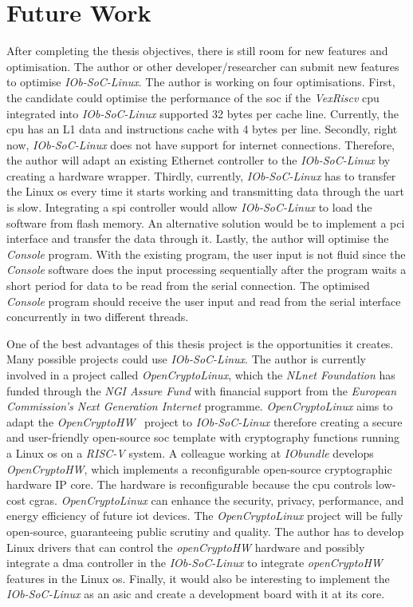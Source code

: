 \section{Future Work}
\label{section:future}
After completing the thesis objectives, there is still room for new features and optimisation. The author or other developer/researcher can submit new features to optimise \textit{IOb-SoC-Linux}. The author is working on four optimisations. First, the candidate could optimise the performance of the \acrshort{soc} if the \textit{VexRiscv} \acrshort{cpu} integrated into \textit{IOb-SoC-Linux} supported 32 bytes per cache line. Currently, the \acrshort{cpu} has an L1 data and instructions cache with 4 bytes per line. Secondly, right now, \textit{IOb-SoC-Linux} does not have support for internet connections. Therefore, the author will adapt an existing Ethernet controller to the \textit{IOb-SoC-Linux} by creating a hardware wrapper. Thirdly, currently, \textit{IOb-SoC-Linux} has to transfer the Linux \acrshort{os} every time it starts working and transmitting data through the \acrshort{uart} is slow. Integrating a \acrfull{spi} controller would allow \textit{IOb-SoC-Linux} to load the software from flash memory. An alternative solution would be to implement a \acrshort{pci} interface and transfer the data through it. Lastly, the author will optimise the \textit{Console} program. With the existing program, the user input is not fluid since the \textit{Console} software does the input processing sequentially after the program waits a short period for data to be read from the serial connection. The optimised \textit{Console} program should receive the user input and read from the serial interface concurrently in two different threads.

One of the best advantages of this thesis project is the opportunities it creates. Many possible projects could use \textit{IOb-SoC-Linux}. The author is currently involved in a project called \textit{OpenCryptoLinux}, which the \textit{NLnet Foundation} has funded through the \textit{NGI Assure Fund} with financial support from the \textit{European Commission's Next Generation Internet} programme. \textit{OpenCryptoLinux} aims to adapt the \textit{OpenCryptoHW}~\cite{open_crypto_hw} project to \textit{IOb-SoC-Linux} therefore creating a secure and user-friendly open-source \acrshort{soc} template with cryptography functions running a Linux \acrshort{os} on a \textit{RISC-V} system. A colleague working at \textit{IObundle} develops \textit{OpenCryptoHW}, which implements a reconfigurable open-source cryptographic hardware IP core. The hardware is reconfigurable because the \acrshort{cpu} controls low-cost \acrfull{cgras}. \textit{OpenCryptoLinux} can enhance the security, privacy, performance, and energy efficiency of future \acrfull{iot} devices. The \textit{OpenCryptoLinux} project will be fully open-source, guaranteeing public scrutiny and quality. The author has to develop Linux drivers that can control the \textit{openCryptoHW} hardware and possibly integrate a \acrshort{dma} controller in the \textit{IOb-SoC-Linux} to integrate \textit{openCryptoHW} features in the Linux \acrshort{os}. Finally, it would also be interesting to implement the \textit{IOb-SoC-Linux} as an \acrshort{asic} and create a development board with it at its core.
